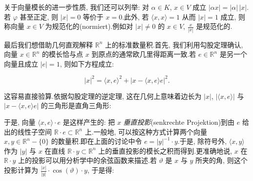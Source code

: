 关于向量模长的进一步性质, 我们还可以列举: 对 $\alpha \in K$, $x \in V$ 成立 $|\alpha x| = |\alpha| \, |x|$.若 $\varphi$ 甚至正定, 则 $|x| = 0$ 等价于 $x = 0$.此外, 若 $\langle x, x \rangle = 1$ 从而 $|x| = 1$ 成立, 则称向量 $x \in V$ 为规范化的(normiert).例如对 $|x| \neq 0$ 的 $x \in V$, $\frac{x}{|x|}$ 是规范化的.

最后我们想借助几何直观解释 $\mathbb{R}^n$ 上的标准数量积.首先, 我们利用勾股定理确认, 向量 $x \in \mathbb{R}^n$ 的模长恰与点 $x$ 到原点的通常欧几里得距离一致.若 $e \in \mathbb{R}^n$ 是另一个向量且成立 $|e| = 1$, 则如下方程成立:

\[
|x|^2 = \langle x, e \rangle^2 + |x - \langle x, e \rangle e|^2\text{.}
\]

这容易直接验算.依据勾股定理的逆定理, 这在几何上意味着边长为 $|x|$, $|\langle x, e \rangle|$ 与 $|x - \langle x, e \rangle e|$ 的三角形是直角三角形:

\begin{center}
\end{center}

于是, 向量 $\langle x, e \rangle \cdot e$ 是这样产生的: 把 $x$ \emph{垂直投影}(\textup{senkrechte Projektion})到由 $e$ 给出的线性子空间 $\mathbb{R} \cdot e \subset \mathbb{R}^n$ 上.一般地, 可以按这种方式计算两个向量 $x, y \in \mathbb{R}^n - \{0\}$ 的数量积.即在上面的讨论中令 $e = |y|^{-1} \cdot y$.于是, 除符号外, $\langle x, y \rangle$ 作为 $|y|$ 与 $x$ 在直线 $\mathbb{R} \cdot y \subset \mathbb{R}^n$ 上的垂直投影的模长之积而得到.更准确地说, $x$ 在 $\mathbb{R} \cdot y$ 上的投影可以用分析学中的余弦函数来描述.若 $\vartheta$ 是 $x$ 与 $y$ 所夹的角, 则这个投影计算为 $\frac{|x|}{|y|} \cdot \cos(\vartheta) \cdot y$, 于是得:

